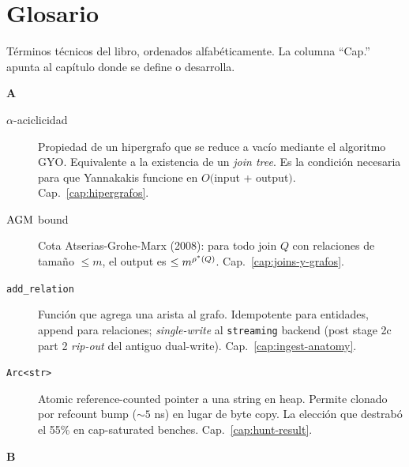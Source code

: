 \chapter{Glosario}
\label{ap:glosario}

Términos técnicos del libro, ordenados alfabéticamente. La columna
``Cap.'' apunta al capítulo donde se define o desarrolla.

\renewcommand{\arraystretch}{1.3}

\noindent
\textbf{A}

\begin{description}
    \item[\(\alpha\)-aciclicidad] Propiedad de un hipergrafo que se
    reduce a vacío mediante el algoritmo GYO. Equivalente a la
    existencia de un \emph{join tree}. Es la condición necesaria
    para que Yannakakis funcione en \(O(\)input + output\()\).
    Cap.~\ref{cap:hipergrafos}.

    \item[\(\mathrm{AGM}\) bound] Cota Atserias-Grohe-Marx (2008): para
    todo join \(Q\) con relaciones de tamaño \(\leq m\), el output
    es \(\leq m^{\rho^{*}(Q)}\). Cap.~\ref{cap:joins-y-grafos}.

    \item[\texttt{add\_relation}] Función que agrega una arista al
    grafo. Idempotente para entidades, append para relaciones;
    \emph{single-write} al \texttt{streaming} backend (post stage 2c
    part 2 \emph{rip-out} del antiguo dual-write).
    Cap.~\ref{cap:ingest-anatomy}.

    \item[\texttt{Arc<str>}] Atomic reference-counted pointer a una
    string en heap. Permite clonado por refcount bump
    (\(\sim 5\) ns) en lugar de byte copy. La elección que destrabó
    el 55\% en cap-saturated benches. Cap.~\ref{cap:hunt-result}.
\end{description}

\noindent
\textbf{B}

